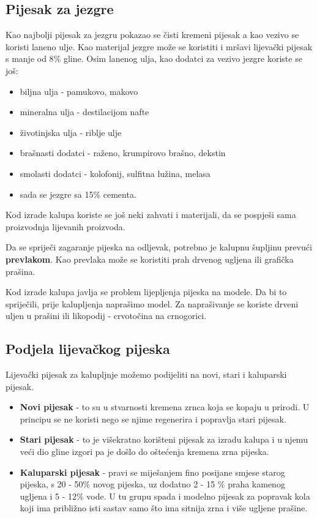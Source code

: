 \documentclass[a4paper,12pt]{article}
\numberwithin{figure}{section}
\begin{document}
\subsection{Pijesak za jezgre}
Kao najbolji pijesak za jezgru pokazao se čisti kremeni pijesak a kao vezivo se koristi laneno ulje. Kao materijal jezgre može se koristiti i mršavi lijevački pijesak s manje od 8$\%$ gline. Osim lanenog ulja, kao dodatci za vezivo jezgre koriste se još:
\begin{itemize}
\item biljna ulja - pamukovo, makovo
\item mineralna ulja - destilacijom nafte
\item životinjska ulja - riblje ulje
\item brašnasti dodatci - raženo, krumpirovo brašno, dekstin
\item smolasti dodatci - kolofonij, sulfitna lužina, melasa
\item sada se jezgre sa 15$\%$ cementa.
\end{itemize}
Kod izrade kalupa koriste se još neki zahvati i materijali, da se pospješi sama proizvodnja lijevanih proizvoda.\par
Da se spriječi zagaranje pijeska na odljevak, potrebno je kalupnu šupljinu prevući \textbf{prevlakom}. Kao prevlaka može se koristiti prah drvenog ugljena ili grafička prašina.\par
Kod izrade kalupa javlja se problem lijepljenja pijeska na modele. Da bi to spriječili, prije kalupljenja naprašimo model. Za naprašivanje se koriste drveni uljen u prašini ili likopodij - crvotočina na crnogorici.
\subsection{Podjela lijevačkog pijeska}
Lijevački pijesak za kalupljnje možemo podijeliti na novi, stari i kaluparski pijesak.
\begin{itemize}
\item \textbf{Novi pijesak} - to su u stvarnosti kremena zrnca koja se kopaju u prirodi. U principu se ne koristi nego se njime regenerira i popravlja stari pijesak.
\item \textbf{Stari pijesak} - to je višekratno korišteni pijesak za izradu kalupa i u njemu veći dio gline izgori pa je došlo do oštećenja kremena zrna pijeska.
\item \textbf{Kaluparski pijesak} - pravi se miješanjem fino posijane smjese starog pijeska, s 20 - 50$\%$ novog pijeska, uz dodatno 2 - 15 $\%$ praha kamenog ugljena i 5 - 12$\%$  vode. U tu grupu spada i modelno pijesak za popravak kola koji ima približno isti sastav samo što ima sitnija zrna i više ugljene prašine.
\end{itemize}
\end{document}
